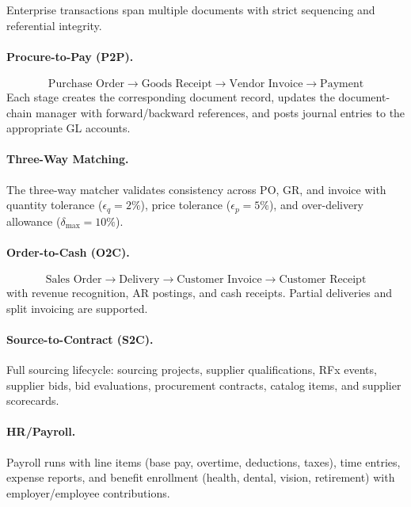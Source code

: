 Enterprise transactions span multiple documents with strict sequencing
and referential integrity.

\paragraph{Procure-to-Pay (P2P).}
\[
\text{Purchase Order} \to \text{Goods Receipt} \to \text{Vendor Invoice}
\to \text{Payment}
\]
Each stage creates the corresponding document record, updates the
document-chain manager with forward/backward references, and posts
journal entries to the appropriate GL accounts.

\paragraph{Three-Way Matching.}
The three-way matcher validates consistency across PO, GR, and invoice
with quantity tolerance ($\epsilon_q = 2\%$), price tolerance
($\epsilon_p = 5\%$), and over-delivery allowance ($\delta_{\max} = 10\%$).

\paragraph{Order-to-Cash (O2C).}
\[
\text{Sales Order} \to \text{Delivery} \to \text{Customer Invoice}
\to \text{Customer Receipt}
\]
with revenue recognition, AR postings, and cash receipts.  Partial
deliveries and split invoicing are supported.

\paragraph{Source-to-Contract (S2C).}
Full sourcing lifecycle: sourcing projects, supplier qualifications,
RFx events, supplier bids, bid evaluations, procurement contracts,
catalog items, and supplier scorecards.

\paragraph{HR/Payroll.}
Payroll runs with line items (base pay, overtime, deductions, taxes),
time entries, expense reports, and benefit enrollment (health, dental,
vision, retirement) with employer/employee contributions.

